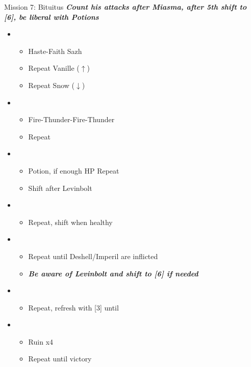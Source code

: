 \begin{battle}{Mission 7: Bituitus}
	\textit{\textbf{Count his attacks after Miasma, after 5th shift to [6], be liberal with Potions}}
	\begin{itemize}
		\item \first
			\begin{itemize}
				\item Haste-Faith Sazh
				\item Repeat Vanille ($\uparrow$)
				\item Repeat Snow ($\downarrow$)
			\end{itemize}
		\item \fourth
			\begin{itemize}
				\item Fire-Thunder-Fire-Thunder
				\item Repeat
			\end{itemize}
		\item \sixth
			\begin{itemize}
				\item Potion, if enough HP Repeat
				\item Shift after Levinbolt
			\end{itemize}
		\item \third
			\begin{itemize}
				\item Repeat, shift when healthy
			\end{itemize}
		\item \fourth
			\begin{itemize}
				\item Repeat until Deshell/Imperil are inflicted
				\item \textit{\textbf{Be aware of Levinbolt and shift to [6] if needed}}
			\end{itemize}
		\item \second
			\begin{itemize}
				\item Repeat, refresh with [3] until \stagger
			\end{itemize}
		\item \fifth
			\begin{itemize}
				\item Ruin x4
				\item Repeat until victory
			\end{itemize}
	\end{itemize}
\end{battle}

